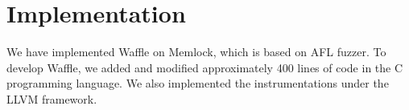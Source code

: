 \section{Implementation}

We have implemented Waffle on Memlock, which is based on AFL fuzzer. To develop Waffle, we added and modified approximately 400 lines of code in the C programming language. We also implemented the instrumentations under the LLVM framework.
